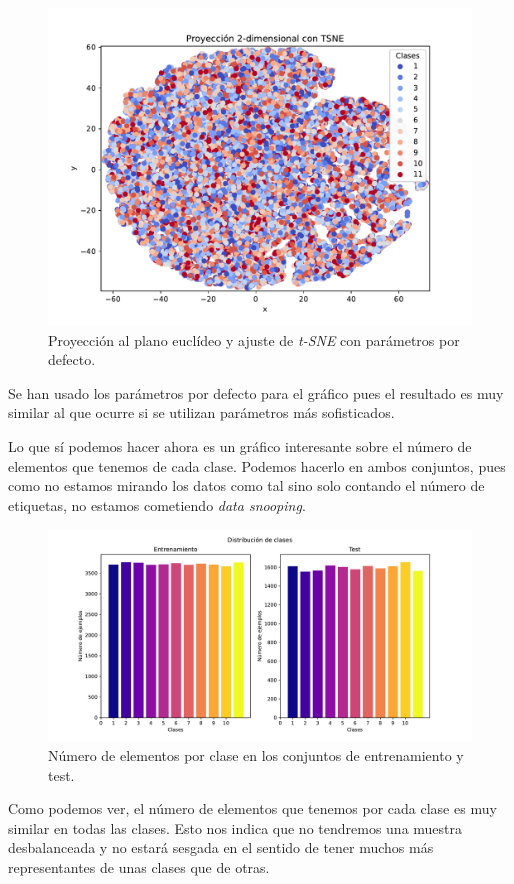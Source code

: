 \documentclass[a4paper, 20pt]{article}
\begin{document}
\begin{figure}[H]
  \centering
  \includegraphics[width=0.55\linewidth]{media/tsne.pdf}
  \caption{Proyección al plano euclídeo y ajuste de \emph{t-SNE} con parámetros por defecto. }
  \label{fig:tsne}
\end{figure}

Se han usado los parámetros por defecto para el gráfico pues el resultado es muy similar al que ocurre si se utilizan parámetros más sofisticados.

Lo que sí podemos hacer ahora es un gráfico interesante sobre el número de elementos que tenemos de cada clase. Podemos hacerlo en ambos conjuntos, pues como no estamos mirando los datos como tal sino solo contando el número de etiquetas, no estamos cometiendo \emph{data snooping}.


\begin{figure}[H]
  \centering
  \includegraphics[scale=0.4]{media/class_distr.pdf}
  \caption{Número de elementos por clase en los conjuntos de entrenamiento y test. }
  \label{fig:class-numbers}
\end{figure}

Como podemos ver, el número de elementos que tenemos por cada clase es muy similar en todas las clases. Esto nos indica que no tendremos una muestra desbalanceada y no estará sesgada en el sentido de tener muchos más representantes de unas clases que de otras.
\end{document}
